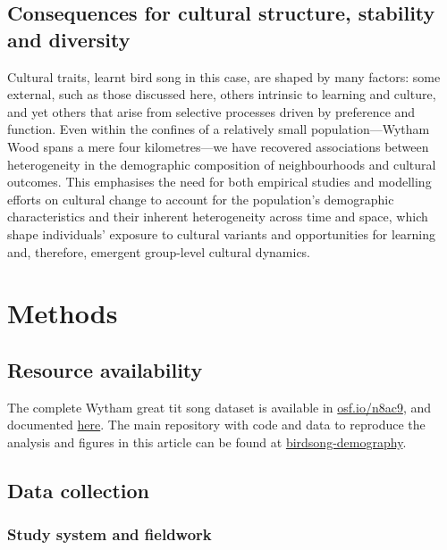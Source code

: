 \documentclass[9pt, twocolumn, twoside]{gsajnl}
\begin{document}
\subsection{Consequences for cultural structure, stability and diversity}

Cultural traits, learnt bird song in this case, are shaped by many factors: some external, such as those discussed here, others intrinsic to learning and culture, and yet others that arise from selective processes driven by preference and function. Even within the confines of a relatively small population---Wytham Wood spans a mere four kilometres---we have recovered associations between heterogeneity in the demographic composition of neighbourhoods and cultural outcomes. This emphasises the need for both empirical studies and modelling efforts on cultural change to account for the population's demographic characteristics and their inherent heterogeneity across time and space, which shape individuals' exposure to cultural variants and opportunities for learning and, therefore, emergent group-level cultural dynamics.

\section{Methods}

\subsection{Resource availability}

The complete Wytham great tit song dataset is available in \href{https://osf.io/n8ac9}{osf.io/n8ac9}, and documented \href{https://nilomr.github.io/great-tit-hits/}{here}. The main repository with code and data to reproduce the analysis and figures in this article can be found at \href{http://github.com/nilomr/birdsong-demography}{birdsong-demography}.

\subsection{Data collection}

\subsubsection{Study system and fieldwork}
\end{document}
